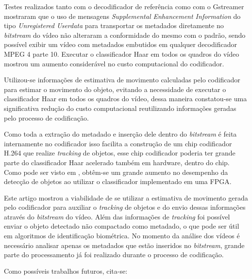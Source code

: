 \documentclass[12pt]{article}
\begin{document}
Testes realizados tanto com o decodificador de referência como com o Gstreamer mostraram que o uso de mensagens \textit{Supplemental Enhancement Information} do tipo \textit{Unregistered Userdata} para transportar os metadados diretamente no \textit{bitstream} do vídeo não alteraram a conformidade do mesmo com o padrão, sendo possível exibir um vídeo com metadados embutidos em qualquer decodificador MPEG 4 parte 10. Executar o classificador Haar em todos os quadros do vídeo mostrou um aumento considerável no custo computacional do codificador. 

Utilizou-se informações de estimativa de movimento calculadas pelo codificador para estimar o movimento do objeto, evitando a necessidade de executar o classificador Haar em todos os quadros do vídeo, dessa maneira constatou-se uma significativa redução do custo computacional reutilizando informações geradas pelo processo de codificação. 

Como toda a extração do metadado e inserção dele dentro do \textit{bitstream} é feita internamente no codificador isso facilita a construção de um chip codificador H.264 que realize \textit{tracking} de objetos, esse chip codificador poderia ter grande parte do classificador Haar acelerado também em hardware, dentro do chip. Como pode ser visto em \cite{haarFPGA}, obtêm-se um grande aumento no desempenho da detecção de objetos ao utilizar o classificador implementado em uma FPGA. 

Este artigo mostrou a viabilidade de se utilizar a estimativa de movimento gerada pelo codificador para auxiliar o \textit{tracking} de objetos e do envio dessas informações através do \textit{bitstream} do vídeo. Além das informações de \textit{tracking} foi possível enviar o objeto detectado não compactado como metadado, o que pode ser útil em algoritmos de identificação biométrica. No momento da análise dos vídeos é necessário analisar apenas os metadados que estão inseridos no \textit{bitstream}, grande parte do processamento já foi realizado durante o processo de codificação.

Como possíveis trabalhos futuros, cita-se: 
\end{document}
